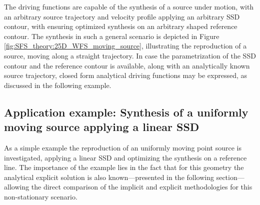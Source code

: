 The driving functions are capable of the synthesis of a source under motion, with an arbitrary source trajectory and velocity profile applying an arbitrary SSD contour, with ensuring optimized synthesis on an arbitrary shaped reference contour.
The synthesis in such a general scenario is depicted in Figure \ref{fig:SFS_theory:25D_WFS_moving_source}, illustrating the reproduction of a source, moving along a straight trajectory.
In case the parametrization of the SSD contour and the reference contour is available, along with an analytically known source trajectory, closed form analytical driving functions may be expressed, as discussed in the following example.

\subsection*{Application example: Synthesis of a uniformly moving source applying a linear SSD}

As a simple example the reproduction of an uniformly moving point source is investigated, applying a linear SSD and optimizing the synthesis on a reference line.
The importance of the example lies in the fact that for this geometry the analytical explicit solution is also known---presented in the following section---allowing the direct comparison of the implicit and explicit methodologies for this non-stationary scenario.

